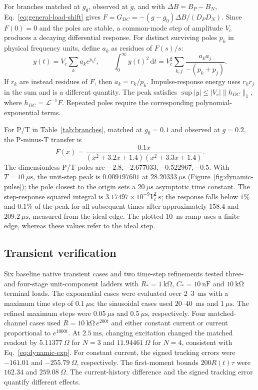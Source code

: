 For branches matched at $g_0$, observed at $g$, and with $\Delta B=B_P-B_N$, Eq.~\eqref{eq:general-load-shift} gives $F=G_{DC}=-(g-g_0)\Delta B/(D_PD_N)$. Since $F(0)=0$ and the poles are stable, a common-mode step of amplitude $V_c$ produces a decaying differential response. For distinct surviving poles $p_k$ in physical frequency units, define $a_k$ as residues of $F(s)/s$:
\begin{equation}\label{eq:cm-pulse}
y(t)=V_c\sum_k a_ke^{p_kt},\qquad
\int_0^\infty y(t)^2\,\mathrm dt
=V_c^2\sum_{k,j}\frac{a_ka_j}{-(p_k+p_j)}.
\end{equation}
If $r_k$ are instead residues of $F$, then $a_k=r_k/p_k$. Impulse-response energy uses $r_kr_j$ in the sum and is a different quantity. The peak satisfies $\sup|y|\le |V_c|\|h_{DC}\|_1$, where $h_{DC}=\mathcal L^{-1}F$. Repeated poles require the corresponding polynomial-exponential terms.

For P/T in Table~\ref{tab:branches}, matched at $g_0=0.1$ and observed at $g=0.2$, the P-minus-T transfer is
\begin{equation}\label{eq:dynamic-pt}
F(x)=\frac{0.1x}{(x^2+3.2x+1.4)(x^2+3.3x+1.4)}.
\end{equation}
The dimensionless P/T poles are $-2.8,-2.677033,-0.522967,-0.5$. With $T=10~\mu\mathrm s$, the unit-step peak is $0.009197601$ at $28.20333~\mu\mathrm s$ (Figure~\ref{fig:dynamic-pulse}); the pole closest to the origin sets a $20~\mu\mathrm s$ asymptotic time constant. The step-response squared integral is $3.17497\times10^{-9}V_c^2~\mathrm s$; the response falls below $1\%$ and $0.1\%$ of the peak for all subsequent times after approximately $158.4$ and $209.2~\mu\mathrm s$, measured from the ideal edge. The plotted $10$~ns ramp uses a finite edge, whereas these values refer to the ideal step.




\subsection{Transient verification}
\label{sec:dynamic-verif}

Six baseline native transient cases and two time-step refinements tested three- and four-stage unit-component ladders with $R_*=1~\mathrm{k\Omega}$, $C_*=10~\mathrm{nF}$ and $10~\mathrm{k\Omega}$ terminal loads. The exponential cases were evaluated over $2$--$3$~ms with a maximum time step of $0.1~\mu\mathrm s$; the sinusoidal cases used $20$--$40$~ms and $1~\mu\mathrm s$. The refined maximum steps were $0.05~\mu\mathrm s$ and $0.5~\mu\mathrm s$, respectively. Four matched-channel cases used $R=10~\mathrm{k\Omega}\,e^{200t}$ and either constant current or current proportional to $e^{1000t}$. At $2.5~\mathrm{ms}$, changing excitation changed the matched readout by $5.11377~\Omega$ for $N=3$ and $11.94461~\Omega$ for $N=4$, consistent with Eq.~\eqref{eq:dynamic-exp}. For constant current, the signed tracking errors were $-161.01$ and $-255.79~\Omega$, respectively. The first-moment bounds $200R(t)\tau$ were $162.34$ and $259.08~\Omega$. The current-history difference and the signed tracking error quantify different effects.

